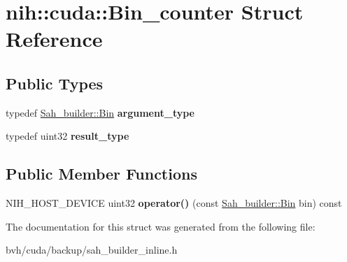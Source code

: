 \hypertarget{structnih_1_1cuda_1_1_bin__counter}{
\section{nih\-:\-:cuda\-:\-:\-Bin\-\_\-counter \-Struct \-Reference}
\label{structnih_1_1cuda_1_1_bin__counter}
}
\subsection*{\-Public \-Types}
\begin{DoxyCompactItemize}
\item 
\hypertarget{structnih_1_1cuda_1_1_bin__counter_af93c779bee8848ca24d327afb341026c}{
typedef \hyperlink{structnih_1_1cuda_1_1_sah__builder_1_1_bin}{\-Sah\-\_\-builder\-::\-Bin} {\bfseries argument\-\_\-type}}
\label{structnih_1_1cuda_1_1_bin__counter_af93c779bee8848ca24d327afb341026c}

\item 
\hypertarget{structnih_1_1cuda_1_1_bin__counter_a36a34503291d6bb3fecee3db69ec9223}{
typedef uint32 {\bfseries result\-\_\-type}}
\label{structnih_1_1cuda_1_1_bin__counter_a36a34503291d6bb3fecee3db69ec9223}

\end{DoxyCompactItemize}
\subsection*{\-Public \-Member \-Functions}
\begin{DoxyCompactItemize}
\item 
\hypertarget{structnih_1_1cuda_1_1_bin__counter_a824c859762adbf6e088912e22e162444}{
\-N\-I\-H\-\_\-\-H\-O\-S\-T\-\_\-\-D\-E\-V\-I\-C\-E uint32 {\bfseries operator()} (const \hyperlink{structnih_1_1cuda_1_1_sah__builder_1_1_bin}{\-Sah\-\_\-builder\-::\-Bin} bin) const }
\label{structnih_1_1cuda_1_1_bin__counter_a824c859762adbf6e088912e22e162444}

\end{DoxyCompactItemize}


\-The documentation for this struct was generated from the following file\-:\begin{DoxyCompactItemize}
\item 
bvh/cuda/backup/sah\-\_\-builder\-\_\-inline.\-h\end{DoxyCompactItemize}
